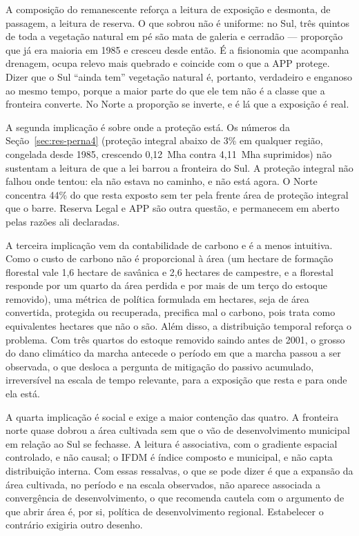 A composição do remanescente reforça a leitura de exposição e desmonta, de
passagem, a leitura de reserva. O que sobrou não é uniforme: no Sul, três
quintos de toda a vegetação natural em pé são mata de galeria e cerradão ---
proporção que já era maioria em 1985 e cresceu desde então. É a fisionomia que acompanha
drenagem, ocupa relevo mais quebrado e coincide com o que a APP protege. Dizer
que o Sul ``ainda tem'' vegetação natural é, portanto, verdadeiro e
enganoso ao mesmo tempo, porque a maior parte do que ele tem não é a classe
que a fronteira converte. No Norte a proporção se inverte, e é lá que a
exposição é real.

A segunda implicação é sobre onde a proteção está. Os números da Seção~\ref{sec:res-perna4}
(proteção integral abaixo de 3\% em qualquer região, congelada desde 1985,
crescendo 0,12~Mha contra 4,11~Mha suprimidos) não sustentam a leitura de que
a lei barrou a fronteira do Sul. A proteção integral não falhou onde tentou:
ela não estava no caminho, e não está agora. O Norte concentra 44\% do que resta
exposto sem ter pela frente área de proteção integral que o barre. Reserva
Legal e APP são outra questão, e permanecem em aberto pelas razões ali
declaradas.

A terceira implicação vem da contabilidade de carbono e é a menos intuitiva.
Como o custo de carbono não é proporcional à área (um hectare de formação
florestal vale 1,6 hectare de savânica e 2,6 hectares de campestre, e a
florestal responde por um quarto da área perdida e por mais de um terço do
estoque removido), uma métrica de política formulada em hectares, seja de área
convertida, protegida ou recuperada, precifica mal o carbono, pois trata como
equivalentes hectares que não
o são. Além disso, a distribuição temporal reforça o problema. Com três
quartos do estoque removido
saindo antes de 2001, o grosso do dano climático da marcha antecede o
período em que a marcha passou a ser observada, o que desloca a pergunta de
mitigação do passivo acumulado, irreversível na escala de tempo relevante,
para a exposição que resta e para onde ela está.

A quarta implicação é social e exige a maior contenção das quatro. A
fronteira norte quase dobrou a área cultivada sem que o vão de
desenvolvimento municipal em relação ao Sul se fechasse. A leitura é
associativa, com o gradiente espacial controlado, e não causal; o IFDM é
índice composto e municipal, e não capta distribuição interna. Com essas
ressalvas, o que se pode dizer é que a expansão da área cultivada, no período
e na escala observados, não aparece associada a convergência de
desenvolvimento, o que recomenda cautela com o argumento de que abrir área
é, por si, política de desenvolvimento regional. Estabelecer o contrário
exigiria outro desenho.

